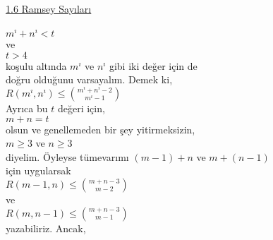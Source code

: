 \documentclass[25pt,a4paper]{memoir}
\begin{document}
    \underline{\huge 1.6 Ramsey Sayıları}\\\\

    $m^{ı} + n^{ı} < t $ \\
    
    \noindent
    ve \\
    
    $ t>4 $ \\
    
    \noindent
    koşulu altında $m^{ı}$ ve $n^{ı}$ gibi iki değer için de \\
    doğru olduğunu varsayalım. Demek ki, \\
    
    $ R(m^{ı},n^{ı}) \leq \binom{{m^{ı}+n^{ı}-2}}{m^{ı}-1}$ \\
    
    \noindent
    Ayrıca bu $t$ değeri için, \\
    
    $ m+n=t $ \\
    
    olsun ve genellemeden bir şey yitirmeksizin, \\
    
    $m \geq 3$  ve $ n \geq 3$ \\
    
    \noindent
    diyelim.  Öyleyse tümevarımı $(m-1)+n$ ve $m+(n-1)$ \\
    için uygularsak\\
    
    $R(m-1,n) \leq \binom{m+n-3}{m-2} $ \\
    
    \noindent
    ve \\
    
    $R(m,n-1) \leq \binom{m+n-3}{m-1} $ \\
    
    \noindent
    yazabiliriz. Ancak,\\
\end{document}
